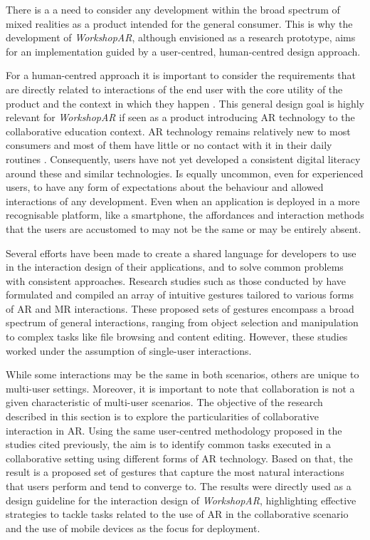 There is a a need to consider any development within the broad spectrum of mixed realities as a product intended for the general consumer. This is why the
development of \emph{WorkshopAR}, although envisioned as a research prototype, aims for an implementation guided by a user-centred, human-centred design approach.

For a human-centred approach it is important to consider the requirements that are directly related to interactions of the end user with the core utility of the product and the context in
which they happen \parencite{boy_2017}. This general design goal is highly relevant for \emph{WorkshopAR} if seen as a product introducing \ac{AR} technology to the collaborative education
context. \ac{AR} technology remains relatively new to most consumers and most of them have little or no contact with it in their daily routines \parencite{chang_2023}. Consequently, users
have not yet developed a consistent digital literacy around these and similar technologies. Is equally uncommon, even for experienced users, to have any form of expectations about the
behaviour and allowed interactions of any development. Even when an application is deployed in a more recognisable platform, like a smartphone, the affordances and interaction methods that
the users are accustomed to may not be the same or may be entirely absent.

Several efforts have been made to create a shared language for developers to use in the interaction design of their applications, and to solve common problems with consistent approaches.
Research studies such as those conducted by \textcite{piumsomboon_2013,wobbrock_2009} have formulated and compiled an array of intuitive gestures tailored to various forms of \ac{AR} and
\acf{MR} interactions. These proposed sets of gestures encompass a broad spectrum of general interactions, ranging from object selection and manipulation to complex tasks like file browsing
and content editing. However, these studies worked  under the assumption of single-user interactions.

While some interactions may be the same in both scenarios, others are unique to multi-user settings. Moreover, it is important to note that collaboration is not a given characteristic of
multi-user scenarios. The objective of the research described in this section is to explore the particularities of collaborative interaction in \ac{AR}. Using the same user-centred
methodology proposed in the studies cited previously, the aim is to identify common tasks executed in a collaborative setting using different forms of \ac{AR} technology. Based on that,
the result is a proposed set of gestures that capture the most natural interactions that users perform and tend to converge to. The results were directly used as a design guideline for the
interaction design of \emph{WorkshopAR}, highlighting effective strategies to tackle tasks related to the use of AR in the collaborative scenario and the use of mobile devices as the focus
for deployment.

